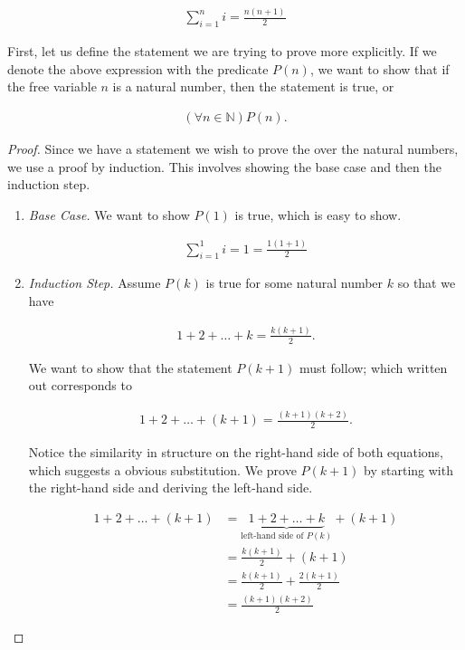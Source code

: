 \begin{align*}
	\sum_{i = 1}^{n} i = \frac{n(n + 1)}{2}
\end{align*}

First, let us define the statement we are trying to prove more explicitly. If we denote the above expression with the predicate $P(n)$, we want to show that if the free variable $n$ is a natural number, then the statement is true, or

\begin{align*}
	(\forall n \in \mathbb{N})P(n).
\end{align*}

\vspace{\baselineskip}
\begin{proof}
	Since we have a statement we wish to prove the over the natural numbers, we use a proof by induction. This involves showing the base case and then the induction step.
	
	\vspace{\baselineskip}
	\begin{enumerate}
		\item \emph{Base Case.} We want to show $P(1)$ is true, which is easy to show.
		
		\begin{align*}
			\sum_{i = 1}^1 i = 1 = \frac{1 (1 + 1)}{2}
		\end{align*}
		
		\item \emph{Induction Step.} Assume $P(k)$ is true for some natural number $k$ so that we have
		
		\begin{align*}
			1 + 2 + \dots + k = \frac{k(k + 1)}{2}.
		\end{align*}
		
		We want to show that the statement $P(k + 1)$ must follow; which written out corresponds to
		
		\begin{align*}
			1 + 2 + \dots + (k + 1) = \frac{(k + 1)(k + 2)}{2}.
		\end{align*}
		
		Notice the similarity in structure on the right-hand side of both equations, which suggests a obvious substitution. We prove $P(k + 1)$ by starting with the right-hand side and deriving the left-hand side.
		
		\begin{align*}
			1 + 2 + \dots + (k + 1) &= \underbrace{1 + 2 + \dots + k}_\text{left-hand side of $P(k)$} + (k + 1) \\
			&= \frac{k (k + 1)}{2} + (k + 1) \\
			&= \frac{k (k + 1)}{2} + \frac{2 (k + 1)}{2} \\
			&= \frac{(k + 1)(k + 2)}{2}
		\end{align*}
		

\end{enumerate}
\end{proof}

